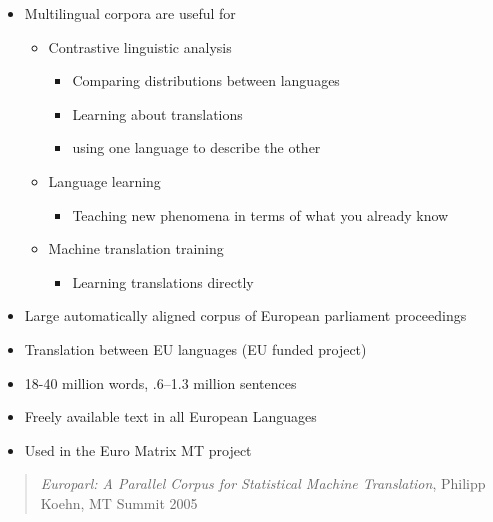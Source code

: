 \documentclass[a4paper,landscape,headrule,footrule,dvips]{foils}
\begin{document}
\begin{CJK}{UTF8}{min}

\begin{itemize}
\item Multilingual corpora are useful for
  \begin{itemize}
  \item Contrastive linguistic analysis
    \begin{itemize}
    \item Comparing distributions between languages
    \item Learning about translations
    \item using one language to describe the other
    \end{itemize}
  \item Language learning
    \begin{itemize}
    \item Teaching new phenomena in terms of what you already know
    \end{itemize}
  \item Machine translation training
    \begin{itemize}
    \item Learning translations directly
    \end{itemize}
  \end{itemize}
\end{itemize}


\begin{itemize}
\item Large automatically aligned corpus of European parliament proceedings
  \item Translation between EU languages (EU funded project)
  \item 18-40 million words, .6--1.3 million sentences
  \item Freely available text in all European Languages
  \item Used in the Euro Matrix MT project
\end{itemize}
\begin{quote}
  \textit{Europarl: A Parallel Corpus for Statistical Machine Translation}, Philipp Koehn, MT Summit 2005
\end{quote}



  \MyLogo{}
\begin{center}
\end{center}


\end{CJK}
\end{document}
